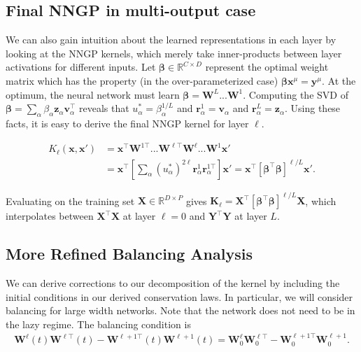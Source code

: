\documentclass{article} %
\def\x{\bm x}
\begin{document}
\begin{appendix}
\subsection{Final NNGP in multi-output case}

We can also gain intuition about the learned representations in each layer by looking at the NNGP kernels, which merely take inner-products between layer activations for different inputs. Let $\bm\beta \in \mathbb{R}^{C \times D}$ represent the optimal weight matrix which has the property (in the over-parameterized case) $\bm\beta \bm x^\mu = \bm y^\mu$. At the optimum, the neural network must learn $\bm\beta = \bm W^{L} ... \bm W^1$. Computing the SVD of $\bm\beta = \sum_\alpha \beta_{\alpha} \bm z_{\alpha} \bm v_{\alpha}^\top$ reveals that $u^*_\alpha = \beta_\alpha^{1/L}$ and $\bm r^1_\alpha= \bm v_{\alpha}$ and $\bm r^{L}_\alpha = \bm z_\alpha$. Using these facts, it is easy to derive the final NNGP kernel for layer $\ell$. 

\begin{equation}
\begin{aligned}
    K_{\ell}(\x,\x') &= \x^\top \bm W^{1 \top } ... \bm W^{\ell \top} \bm W^{\ell } ... \bm W^{1} \x' \\
    &= \x^\top \left[  \sum_\alpha \left( u_\alpha^* \right)^{2\ell} \bm r_\alpha^1 \bm r_\alpha^{1\top} \right] \x' = \x^\top \left[ \bm\beta^\top \bm\beta \right]^{\ell/L} \x'.
\end{aligned}
\end{equation}

Evaluating on the training set $\bm X \in \mathbb{R}^{D \times P}$ gives $\bm K_{\ell} = \bm X^\top \left[ \bm\beta^\top \bm\beta \right]^{\ell/L} \bm X$, which interpolates between $\bm X^\top \bm X$ at layer $\ell=0$ and $\bm Y^\top \bm Y$ at layer $L$.

\subsection{More Refined Balancing Analysis}\label{app:refined_balance}

We can derive corrections to our decomposition of the kernel by including the initial conditions in our derived conservation laws. In particular, we will consider balancing for large width networks. Note that the network does not need to be in the lazy regime. The balancing condition is
\begin{align}
    \bm W^{\ell}(t) \bm W^{\ell \top}(t) - \bm W^{\ell + 1 \top}(t) \bm W^{\ell + 1}(t) = \bm W^{\ell}_0\bm W^{\ell \top}_0 - \bm W^{\ell + 1 \top}_0 \bm W^{\ell + 1}_0.
\end{align}


\end{appendix}
\end{document}

